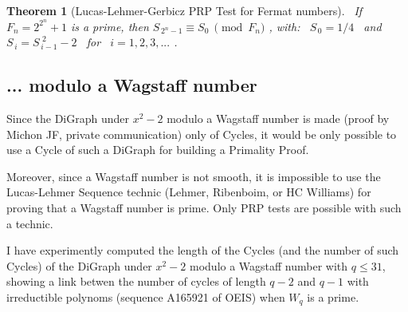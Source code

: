 \documentclass[latin1]{quadrature}
\newcommand{\PMod}[1]{\!\!\pmod{#1}}
\newtheorem{theorem}{Theorem}
\newif\ifenfrancais
\begin{document}
\begin{article}
\begin{article}
\ifenfrancais
\begin{theorem}[Lucas-Lehmer-Gerbicz : PRP Test pour les nombres de Fermat]
\ 
Si $F_n = 2^{2^n}+1$ est premier, alors $S_{\,2^n-1} \equiv S_0 \ \PMod{F_n}$ ,
avec : \ $S_{\,0} = 1/4$ \ et \ $S_{\,i} = S_{\,i-1}^{\,\,2} - 2$ \ pour \ $i=1,2,3, ...$ .
\end{theorem}
\else
\begin{theorem}[Lucas-Lehmer-Gerbicz PRP Test for Fermat numbers]
\ 
If $F_n = 2^{2^n}+1$ is a prime, then $S_{\,2^n-1} \equiv S_0 \ \PMod{F_n}$ ,
with: \ $S_{\,0} = 1/4$ \ and \ $S_{\,i} = S_{\,i-1}^{\,\,2} - 2$ \ for \ $i=1,2,3, ...$ .
\end{theorem}
\fi


\ifenfrancais
\subsection{ ... modulo un nombre de Wagstaff }
\else
\subsection{ ... modulo a Wagstaff number }
\fi

\ifenfrancais
Comme le DiGraph sous $x^2-2$ modulo un nombre de Wagstaff premier est constitu\'e (preuve par JF Michon, communication priv\'ee) uniquement de Cycles, la seule solution possible pour construire un test de primalit\'e consisterait \`a utiliser un Cycle d'un tel DiGraph. 
\else
Since the DiGraph under $x^2-2$ modulo a Wagstaff number is made (proof by Michon JF, private communication) only of Cycles, it would be only possible to use a Cycle of such a DiGraph for building a Primality Proof.
\fi

\vspace{.05in}
\ifenfrancais
De plus, comme un nombre de Wagstaff n'est pas smooth, il est impossible d'utiliser la technique des S\'equences de Lucas-Lehmer (Lehmer, Ribenboim, ou HC Williams) pour prouver qu'un nombre de Wagstaff est premier. Avec cette technique, on ne peut construire que des tests de PRP.
\else
Moreover, since a Wagstaff number is not smooth, it is impossible to use the Lucas-Lehmer Sequence technic (Lehmer, Ribenboim, or HC Williams) for proving that a Wagstaff number is prime. Only PRP tests are possible with such a technic.
\fi

\vspace{.1in}

\ifenfrancais
J'ai calcul\'e exp\'erimentalement la longueur des Cycles (et le nombre de tels Cycles) du DiGraph sous $x^2-2$ modulo un nombre de Wagstaff avec $q \leq 31$. Ce qui a montr\'e un lien entre le nombre de Cycles de longueur $q-2$ et $q-1$ avec les polyn\^omes irr\'eductibles (s\'equence A165961 de OEIS), quand $W_q$ est premier.
\else
I have experimently computed the length of the Cycles (and the number of such Cycles) of the DiGraph under $x^2-2$ modulo a Wagstaff number with $q \leq 31$, showing a link betwen the number of cycles of length $q-2$ and $q-1$ with irreductible polynoms (sequence A165921 of OEIS) when $W_q$ is a prime.
\fi


\end{article}
\end{article}
\end{document}
